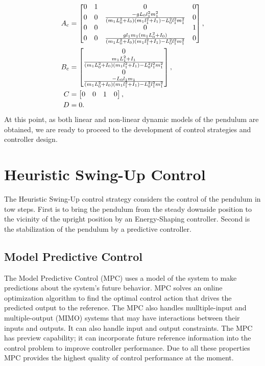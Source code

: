 \begin{subequations}\label{linmatrices}
	\begin{align}
	A _{\text{c}} &=\begin{bmatrix}0&1&0&0\\
	0&0&\frac{-gL_0l_1^2m_1^2}{(m_1L_0^2+I_0)(m_1l_1^2+I_1)-L_0^2l_1^2m_1^2}&0\\
	0&0&0&1\\
	0&0&\frac{gl_1m_1(m_1L_0^2+I_0)}{(m_1L_0^2+I_0)(m_1l_1^2+I_1)-L_0^2l_1^2m_1^2}&0
	\end{bmatrix},\\
	B _{\text{c}} &=	\begin{bmatrix}
	0\\ 
	\frac{m_1L_1^2+I_1}{(m_1L_0^2+I_0)(m_1l_1^2+I_1)-L_0^2l_1^2m_1^2}\\
	0\\
	\frac{-L_0l_1m_1}{(m_1L_0^2+I_0)(m_1l_1^2+I_1)-L_0^2l_1^2m_1^2}
	\end{bmatrix},\\
	C &= \begin{bmatrix}0&0&1&0\end{bmatrix},\\
	D &= 0.
	\end{align}
\end{subequations}
At this point, as both linear and non-linear dynamic models of the pendulum are obtained, we are ready to proceed to the development of control strategies and controller design.
\section{Heuristic Swing-Up Control}\label{Hswing:teoria}
The Heuristic Swing-Up control strategy considers the control of the pendulum in tow steps. First is to bring the pendulum from the steady downside position to the vicinity of the upright position by an Energy-Shaping controller. Second is the stabilization of the pendulum by a predictive controller.
\subsection{Model Predictive Control}\label{mpcsection}
The Model Predictive Control (MPC) uses a model of the system to make predictions about the system’s future behavior. MPC solves an online optimization algorithm to find the optimal control action that drives the predicted output to the reference. The MPC also handles mulltiple-input and multiple-output (MIMO) systems that may have interactions between their inputs and outputs. It can also handle input and output constraints. The MPC has preview capability; it can incorporate future reference information into the control problem to improve controller performance. Due to all these properties MPC provides the highest quality of control performance at the moment.
